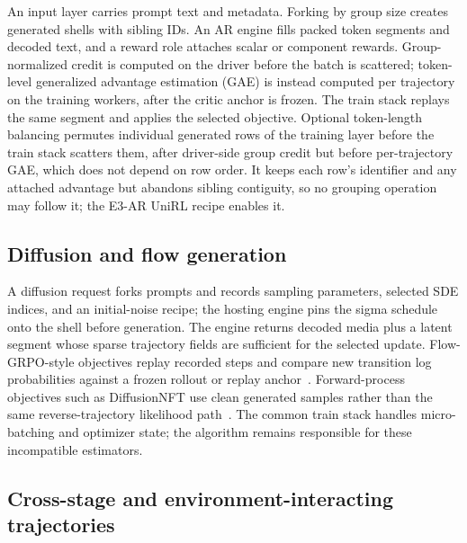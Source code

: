 \documentclass[10pt]{article}
\begin{document}
An input layer carries prompt text and metadata.
Forking by group size creates generated shells with sibling IDs.
An AR engine fills packed token segments and decoded text, and a reward role attaches scalar or component rewards.
Group-normalized credit is computed on the driver before the batch is scattered; token-level generalized advantage estimation (GAE) is instead computed per trajectory on the training workers, after the critic anchor is frozen.
The train stack replays the same segment and applies the selected objective.
Optional token-length balancing permutes individual generated rows of the training layer before the train stack scatters them, after driver-side group credit but before per-trajectory GAE, which does not depend on row order.
It keeps each row's identifier and any attached advantage but abandons sibling contiguity, so no grouping operation may follow it; the E3-AR UniRL recipe enables it.

\subsection{Diffusion and flow generation}

A diffusion request forks prompts and records sampling parameters, selected SDE indices, and an initial-noise recipe; the hosting engine pins the sigma schedule onto the shell before generation.
The engine returns decoded media plus a latent segment whose sparse trajectory fields are sufficient for the selected update.
Flow-GRPO-style objectives replay recorded steps and compare new transition log probabilities against a frozen rollout or replay anchor~\citep{liu2025flowgrpo}.
Forward-process objectives such as DiffusionNFT use clean generated samples rather than the same reverse-trajectory likelihood path~\citep{zheng2025diffusionnft}.
The common train stack handles micro-batching and optimizer state; the algorithm remains responsible for these incompatible estimators.

\subsection{Cross-stage and environment-interacting trajectories}
\end{document}
